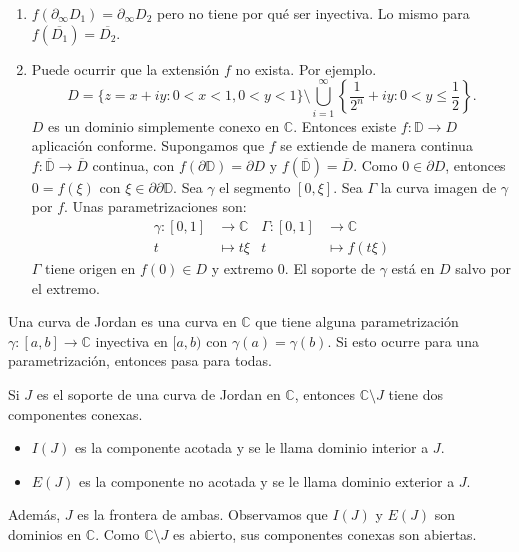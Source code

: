 \begin{remark}
    \hfill
    \begin{enumerate}
        \item $f(\partial_\infty D_1) = \partial_\infty D_2$ pero no tiene por qué ser inyectiva.
              Lo mismo para $f(\overline{D_1}) = \overline{D_2}$.
        \item Puede ocurrir que la extensión $f$ no exista.
              Por ejemplo.
              $$D = \{z = x + iy : 0 < x < 1, 0 < y < 1\} \setminus \bigcup_{i=1}^\infty \left\{\frac{1}{2^n} + iy : 0 < y \leq \frac{1}{2}\right\}.$$
              $D$ es un dominio simplemente conexo en $\mathbb{C}$.
              Entonces existe $f: \mathbb{D} \to D$ aplicación conforme.
              Supongamos que $f$ se extiende de manera continua $f: \overline{\mathbb{D}} \to \overline{D}$ continua, con $f(\partial\mathbb{D}) = \partial D$ y $f(\overline{\mathbb{D}}) = \overline{D}$.
              Como $0 \in \partial D$, entonces $0 = f(\xi)$ con $\xi \in \partial \partial\mathbb{D}$.
              Sea $\gamma$ el segmento $[0, \xi]$.
              Sea $\Gamma$ la curva imagen de $\gamma$ por $f$.
              Unas parametrizaciones son:
              \begin{align*}
                  \gamma: [0, 1] & \to \mathbb{C} & \Gamma: [0, 1] & \to \mathbb{C}  \\
                  t              & \mapsto t\xi   & t              & \mapsto f(t\xi)
              \end{align*}
              $\Gamma$ tiene origen en $f(0) \in D$ y extremo 0.
              El soporte de $\gamma$ está en $D$ salvo por el extremo.
    \end{enumerate}
\end{remark}

Una curva de Jordan es una curva en $\mathbb{C}$ que tiene alguna parametrización $\gamma: [a, b] \to \mathbb{C}$ inyectiva en $[a, b)$ con $\gamma(a) = \gamma(b)$.
Si esto ocurre para una parametrización, entonces pasa para todas.

Si $J$ es el soporte de una curva de Jordan en $\mathbb{C}$, entonces $\mathbb{C} \setminus J$ tiene dos componentes conexas.
\begin{itemize}
    \item $I(J)$ es la componente acotada y se le llama dominio interior a $J$.
    \item $E(J)$ es la componente no acotada y se le llama dominio exterior a $J$.
\end{itemize}
Además, $J$ es la frontera de ambas.
Observamos que $I(J)$ y $E(J)$ son dominios en $\mathbb{C}$.
Como $\mathbb{C} \setminus J$ es abierto, sus componentes conexas son abiertas.

